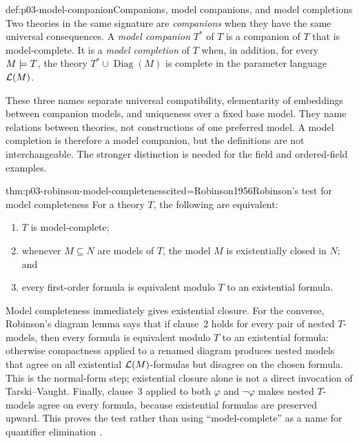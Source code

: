 \begin{hbdefinition}{def:p03-model-companion}{Companions, model companions, and model completions}
Two theories in the same signature are \emph{companions} when they have the
same universal consequences.  A \emph{model companion} \(T^*\) of \(T\) is
a companion of \(T\) that is model-complete.  It is a
\emph{model completion} of \(T\) when, in addition, for every
\(M\models T\), the theory
\(T^*\cup\operatorname{Diag}(M)\) is complete in the parameter language
\(\mathcal{L}(M)\).

These three names separate universal compatibility, elementarity of
embeddings between companion models, and uniqueness over a fixed base model.
They name relations between theories, not constructions of one preferred
model.  A model completion is therefore a model companion, but the definitions
are not interchangeable.  The stronger distinction is needed for the field
and ordered-field examples.
\end{hbdefinition}

\begin{hbtheorem}{thm:p03-robinson-model-completeness}{cited=Robinson1956}{Robinson's test for model completeness}
For a theory \(T\), the following are equivalent:
\begin{enumerate}
  \item \(T\) is model-complete;
  \item whenever \(M\subseteq N\) are models of \(T\), the model \(M\) is
        existentially closed in \(N\); and
  \item every first-order formula is equivalent modulo \(T\) to an
        existential formula.
\end{enumerate}
\end{hbtheorem}

Model completeness immediately gives existential closure.  For the converse,
Robinson's diagram lemma says that if clause~2 holds for every pair of nested
\(T\)-models, then every formula is equivalent modulo \(T\) to an existential
formula: otherwise compactness applied to a renamed diagram produces nested
models that agree on all existential \(\mathcal{L}(M)\)-formulas but disagree on the
chosen formula.  This is the normal-form step; existential closure alone is
not a direct invocation of Tarski--Vaught.  Finally, clause~3 applied to both
\(\varphi\) and \(\neg\varphi\) makes nested \(T\)-models agree on every
formula, because existential formulas are preserved upward.  This proves the
test rather than using ``model-complete'' as a name for quantifier elimination
\cite{Robinson1956,ChangKeisler1990}.

